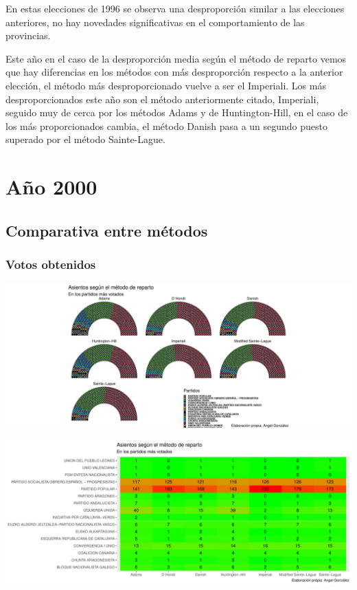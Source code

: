 \documentclass[12pt,a4paper,]{book}
\numberwithin{dummy}{section}
\theoremstyle{ocrenumbox}
\theoremstyle{blacknumex}
\theoremstyle{blacknumbox}
\theoremstyle{ocrenum}
\theoremstyle{ocrenum}
\begin{document}
En estas elecciones de 1996 se observa una desproporción similar a las
elecciones anteriores, no hay novedades significativas en el
comportamiento de las provincias.

Este año en el caso de la desproporción media según el método de reparto
vemos que hay diferencias en los métodos con más desproporción respecto
a la anterior elección, el método más desproporcionado vuelve a ser el
Imperiali. Los más desproporcionados este año son el método
anteriormente citado, Imperiali, seguido muy de cerca por los métodos
Adams y de Huntington-Hill, en el caso de los más proporcionados cambia,
el método Danish pasa a un segundo puesto superado por el método
Sainte-Lague.

\hypertarget{auxf1o-2000}{%
\section{Año 2000}\label{auxf1o-2000}}

\hypertarget{comparativa-entre-muxe9todos-7}{%
\subsection{Comparativa entre
métodos}\label{comparativa-entre-muxe9todos-7}}

\hypertarget{votos-obtenidos-7}{%
\subsubsection{Votos obtenidos}\label{votos-obtenidos-7}}

\begin{center}\includegraphics[width=0.95\linewidth]{figurasR/unnamed-chunk-125-1} \end{center}

\begin{center}\includegraphics[width=0.95\linewidth]{figurasR/unnamed-chunk-125-2} \end{center}
\end{document}
